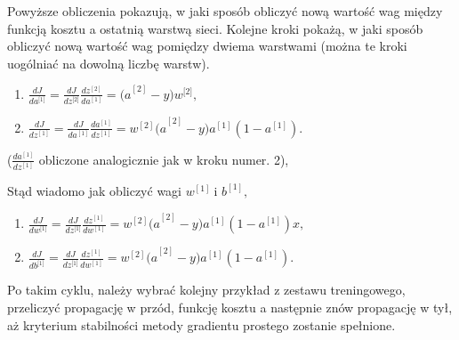 Powyższe obliczenia pokazują, w jaki sposób obliczyć nową wartość wag między funkcją kosztu a ostatnią warstwą sieci. Kolejne kroki pokażą, w jaki sposób obliczyć nową wartość wag pomiędzy dwiema warstwami (można te kroki uogólniać na dowolną liczbę warstw).

\begin{enumerate}
\def\labelenumi{\arabic{enumi}.}
\setcounter{enumi}{5}
\item
  \(\frac{dJ}{da^{\lbrack 1\rbrack}} = \frac{dJ}{dz^{\lbrack 2\rbrack}} \frac{dz^{\left\lbrack 2 \right\rbrack}}{da^{\left\lbrack 1 \right\rbrack}} = {(a}^{\left\lbrack 2 \right\rbrack} - y) w^{\lbrack 2\rbrack},\)
\item
  \(\frac{dJ}{dz^{\left\lbrack 1 \right\rbrack}} = \frac{dJ}{da^{\left\lbrack 1 \right\rbrack}} \frac{da^{\left\lbrack 1 \right\rbrack}}{dz^{\left\lbrack 1 \right\rbrack}} = {w^{\left\lbrack 2 \right\rbrack}(a}^{\left\lbrack 2 \right\rbrack} - y){a}^{\left\lbrack 1 \right\rbrack}(1 - a^{\left\lbrack 1 \right\rbrack}).\)
\end{enumerate}

(\(\frac{da^{\left\lbrack 1 \right\rbrack}}{dz^{\left\lbrack 1 \right\rbrack}}\)
obliczone analogicznie jak w kroku numer. 2),

Stąd wiadomo jak obliczyć wagi \(w^{\left\lbrack 1 \right\rbrack}\ \)i
\(b^{\left\lbrack 1 \right\rbrack},\)

\begin{enumerate}
\def\labelenumi{\arabic{enumi}.}
\setcounter{enumi}{7}
\item
  \(\frac{dJ}{dw^{\lbrack 1\rbrack}} = \frac{dJ}{dz^{\lbrack 1\rbrack}} \frac{dz^{\left\lbrack 1 \right\rbrack}}{dw^{\left\lbrack 1 \right\rbrack}} = {w^{\left\lbrack 2 \right\rbrack}(a}^{\left\lbrack 2 \right\rbrack} - y){a}^{\left\lbrack 1 \right\rbrack}(1 - a^{\left\lbrack 1 \right\rbrack}) x,\)
\item
  \(\frac{dJ}{db^{\lbrack 1\rbrack}} = \frac{dJ}{dz^{\lbrack 1\rbrack}} \frac{dz^{\left\lbrack 1 \right\rbrack}}{dw^{\left\lbrack 1 \right\rbrack}} = {w^{\left\lbrack 2 \right\rbrack}(a}^{\left\lbrack 2 \right\rbrack} - y){a}^{\left\lbrack 1 \right\rbrack}(1 - a^{\left\lbrack 1 \right\rbrack}).\)
\end{enumerate}

Po takim cyklu, należy wybrać kolejny przykład z zestawu treningowego, przeliczyć propagację w przód, funkcję kosztu a następnie znów propagację w tył, aż kryterium stabilności metody gradientu prostego zostanie spełnione.

